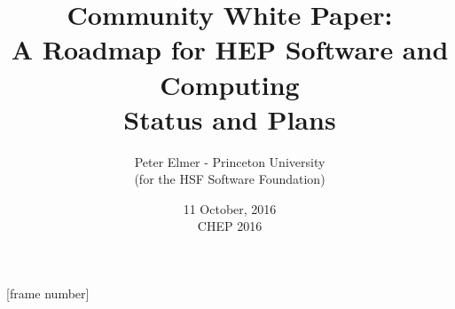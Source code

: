 \documentclass{beamer}
\title{Community White Paper: \\
       A Roadmap for HEP Software and Computing \\
       Status and Plans}
\author{Peter Elmer - Princeton University \\
        (for the HSF Software Foundation)}
\date{11 October, 2016 \\ CHEP 2016}
\begin{document}
\maketitle

%
%

[frame number]

%







%







%



%
%





%






%




%
%
%





\end{document}
